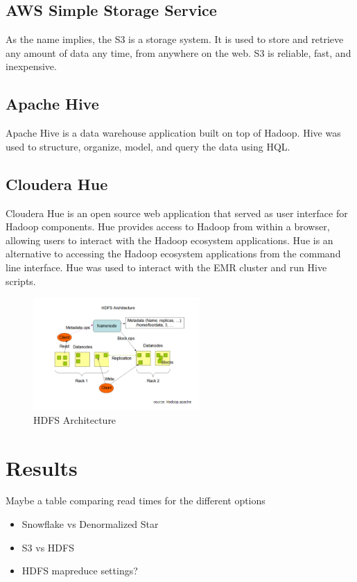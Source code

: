 \documentclass[journal]{IEEEtran}
\begin{document}
\subsection{AWS Simple Storage Service}

As the name implies, the S3 is a storage system.
It is used to store and retrieve any amount of data any time, from anywhere on the web. 
S3 is reliable, fast, and inexpensive.

\subsection{Apache Hive}

Apache Hive is a data warehouse application built on top of Hadoop. 
Hive was used to structure, organize, model, and query the data using HQL.

\subsection{Cloudera Hue}

Cloudera Hue is an open source web application that served as user interface for Hadoop components.
Hue provides access to Hadoop from within a browser, allowing users to interact with the Hadoop ecosystem applications. 
Hue is an alternative to accessing the Hadoop ecosystem applications from the command line interface.
Hue was used to interact with the EMR cluster and run Hive scripts.

\begin{figure}
	\centering
	\includegraphics[width=2.5in]{HDFS_Arch.png}
	\caption{HDFS Architecture}
	\label{HDFS}
\end{figure}

\section{Results}

Maybe a table comparing read times for the different options

\begin{itemize}
	\item Snowflake vs Denormalized Star
	\item S3 vs HDFS
	\item HDFS mapreduce settings?
\end{itemize}
\end{document}
